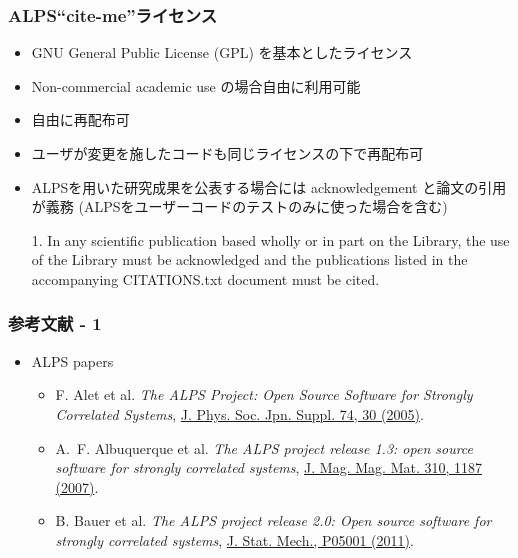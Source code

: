 \begin{frame}
\frametitle{ALPS``cite-me''ライセンス}
  \begin{itemize}
  \item GNU General Public License (GPL) を基本としたライセンス
  \item Non-commercial academic use の場合自由に利用可能
  \item 自由に再配布可
  \item ユーザが変更を施したコードも同じライセンスの下で再配布可
  \item ALPSを用いた研究成果を公表する場合には acknowledgement と論文の引用が義務 (ALPSをユーザーコードのテストのみに使った場合を含む)
    \begin{minipage}{.9\textwidth}
    \begin{block}{}
      1. In any scientific publication based wholly or in part on the
      Library, the use of the Library must be acknowledged and the
      publications listed in the accompanying CITATIONS.txt document
      must be cited.
    \end{block}
    \end{minipage}
  \end{itemize}
\end{frame}

\begin{frame}
  \frametitle{参考文献 - 1}
  \begin{itemize}
  \item ALPS papers
    \begin{itemize}
    \item F. Alet et al. {\it The ALPS Project: Open Source Software for
      Strongly Correlated Systems}, \href{http://jpsj.ipap.jp/link?JPSJS/74S/30}{J. Phys. Soc. Jpn. Suppl. 74, 30 (2005)}.
    \item A.~F. Albuquerque et al. {\it The ALPS project release 1.3: open source software for strongly correlated systems}, \href{http://dx.doi.org/10.1016/j.jmmm.2006.10.304}{J. Mag. Mag. Mat. 310, 1187 (2007)}.
    \item B. Bauer et al. {\it The ALPS project release 2.0: Open source software for strongly correlated systems}, \href{http://iopscience.iop.org/1742-5468/2011/05/P05001}{J. Stat. Mech., P05001 (2011)}.
    \end{itemize}
  \end{itemize}
\end{frame}

